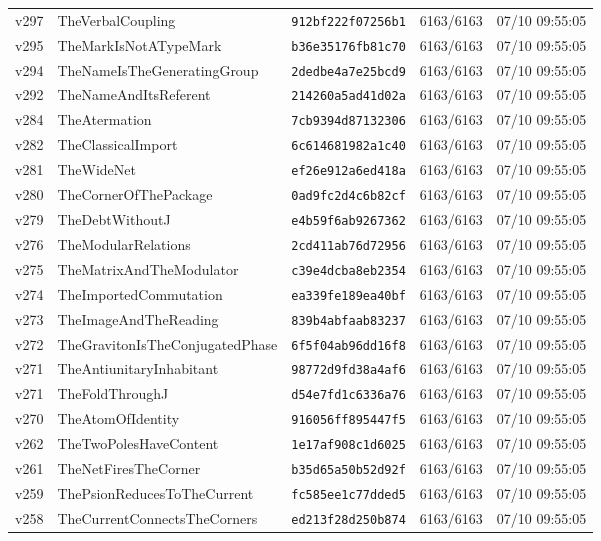 \documentclass[11pt]{article}
\theoremstyle{definition}\newtheorem{deriv}{Derivação}
\begin{document}
{\begin{longtable}{@{}lllll@{}}
v297 & TheVerbalCoupling & \texttt{912bf222f07256b1} & 6163/6163 & 07/10 09:55:05 \\
v295 & TheMarkIsNotATypeMark & \texttt{b36e35176fb81c70} & 6163/6163 & 07/10 09:55:05 \\
v294 & TheNameIsTheGeneratingGroup & \texttt{2dedbe4a7e25bcd9} & 6163/6163 & 07/10 09:55:05 \\
v292 & TheNameAndItsReferent & \texttt{214260a5ad41d02a} & 6163/6163 & 07/10 09:55:05 \\
v284 & TheAtermation & \texttt{7cb9394d87132306} & 6163/6163 & 07/10 09:55:05 \\
v282 & TheClassicalImport & \texttt{6c614681982a1c40} & 6163/6163 & 07/10 09:55:05 \\
v281 & TheWideNet & \texttt{ef26e912a6ed418a} & 6163/6163 & 07/10 09:55:05 \\
v280 & TheCornerOfThePackage & \texttt{0ad9fc2d4c6b82cf} & 6163/6163 & 07/10 09:55:05 \\
v279 & TheDebtWithoutJ & \texttt{e4b59f6ab9267362} & 6163/6163 & 07/10 09:55:05 \\
v276 & TheModularRelations & \texttt{2cd411ab76d72956} & 6163/6163 & 07/10 09:55:05 \\
v275 & TheMatrixAndTheModulator & \texttt{c39e4dcba8eb2354} & 6163/6163 & 07/10 09:55:05 \\
v274 & TheImportedCommutation & \texttt{ea339fe189ea40bf} & 6163/6163 & 07/10 09:55:05 \\
v273 & TheImageAndTheReading & \texttt{839b4abfaab83237} & 6163/6163 & 07/10 09:55:05 \\
v272 & TheGravitonIsTheConjugatedPhase & \texttt{6f5f04ab96dd16f8} & 6163/6163 & 07/10 09:55:05 \\
v271 & TheAntiunitaryInhabitant & \texttt{98772d9fd38a4af6} & 6163/6163 & 07/10 09:55:05 \\
v271 & TheFoldThroughJ & \texttt{d54e7fd1c6336a76} & 6163/6163 & 07/10 09:55:05 \\
v270 & TheAtomOfIdentity & \texttt{916056ff895447f5} & 6163/6163 & 07/10 09:55:05 \\
v262 & TheTwoPolesHaveContent & \texttt{1e17af908c1d6025} & 6163/6163 & 07/10 09:55:05 \\
v261 & TheNetFiresTheCorner & \texttt{b35d65a50b52d92f} & 6163/6163 & 07/10 09:55:05 \\
v259 & ThePsionReducesToTheCurrent & \texttt{fc585ee1c77dded5} & 6163/6163 & 07/10 09:55:05 \\
v258 & TheCurrentConnectsTheCorners & \texttt{ed213f28d250b874} & 6163/6163 & 07/10 09:55:05 \\

\end{longtable}}
\end{document}
